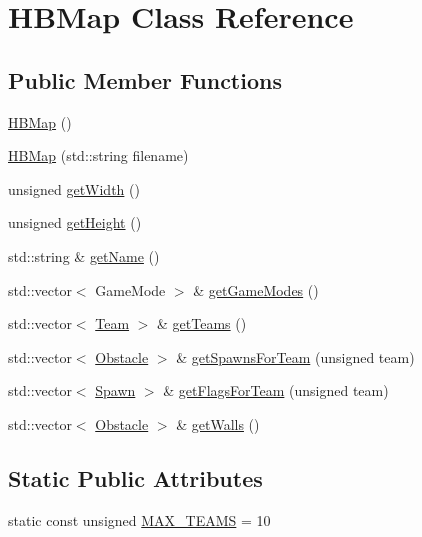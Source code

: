 \hypertarget{class_h_b_map}{\section{H\-B\-Map Class Reference}
\label{class_h_b_map}
}
\subsection*{Public Member Functions}
\begin{DoxyCompactItemize}
\item 
\hyperlink{class_h_b_map_ac67b05db88443e2d7044f134864d2f53}{H\-B\-Map} ()
\item 
\hyperlink{class_h_b_map_a368322ab6cbd98123a00e5df1822d204}{H\-B\-Map} (std\-::string filename)
\item 
unsigned \hyperlink{class_h_b_map_a515e8a0be2e7cce366a81632cce6da4d}{get\-Width} ()
\item 
unsigned \hyperlink{class_h_b_map_a5935af936a849f70c66b0830d517a4c9}{get\-Height} ()
\item 
std\-::string \& \hyperlink{class_h_b_map_a306c703d78a5be354f73186eb9f0cf4c}{get\-Name} ()
\item 
std\-::vector$<$ Game\-Mode $>$ \& \hyperlink{class_h_b_map_a86c9120ba5dea97040c019e99daa0226}{get\-Game\-Modes} ()
\item 
std\-::vector$<$ \hyperlink{class_team}{Team} $>$ \& \hyperlink{class_h_b_map_a17d50199fdc09f1c8fac6b49d2989cbf}{get\-Teams} ()
\item 
std\-::vector$<$ \hyperlink{class_obstacle}{Obstacle} $>$ \& \hyperlink{class_h_b_map_abf3a3b5a59ba22a08d51ef94cc44794d}{get\-Spawns\-For\-Team} (unsigned team)
\item 
std\-::vector$<$ \hyperlink{class_spawn}{Spawn} $>$ \& \hyperlink{class_h_b_map_a841fd545b388d50df1755f788dee9a03}{get\-Flags\-For\-Team} (unsigned team)
\item 
std\-::vector$<$ \hyperlink{class_obstacle}{Obstacle} $>$ \& \hyperlink{class_h_b_map_adb7096539acd9c192b8291bcea719191}{get\-Walls} ()
\end{DoxyCompactItemize}
\subsection*{Static Public Attributes}
\begin{DoxyCompactItemize}
\item 
static const unsigned \hyperlink{class_h_b_map_a86583aaa4db0d7bac49b94d48cdefc86}{M\-A\-X\-\_\-\-T\-E\-A\-M\-S} = 10
\end{DoxyCompactItemize}


